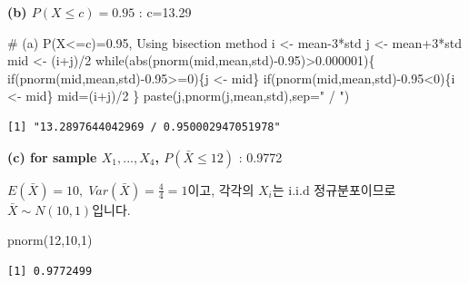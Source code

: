 \documentclass[
  a4paper,
  DIV=11,
  numbers=noendperiod]{scrreprt}
\newenvironment{Shaded}{\begin{snugshade}}{\end{snugshade}}
\newcommand{\AttributeTok}[1]{\textcolor[rgb]{0.40,0.45,0.13}{#1}}
\newcommand{\CommentTok}[1]{\textcolor[rgb]{0.37,0.37,0.37}{#1}}
\newcommand{\ControlFlowTok}[1]{\textcolor[rgb]{0.00,0.23,0.31}{#1}}
\newcommand{\DecValTok}[1]{\textcolor[rgb]{0.68,0.00,0.00}{#1}}
\newcommand{\FloatTok}[1]{\textcolor[rgb]{0.68,0.00,0.00}{#1}}
\newcommand{\FunctionTok}[1]{\textcolor[rgb]{0.28,0.35,0.67}{#1}}
\newcommand{\NormalTok}[1]{\textcolor[rgb]{0.00,0.23,0.31}{#1}}
\newcommand{\OtherTok}[1]{\textcolor[rgb]{0.00,0.23,0.31}{#1}}
\newcommand{\SpecialCharTok}[1]{\textcolor[rgb]{0.37,0.37,0.37}{#1}}
\newcommand{\StringTok}[1]{\textcolor[rgb]{0.13,0.47,0.30}{#1}}
\begin{document}
\textbf{(b) \(P(X\leq c)=0.95\)} : c=13.29

\begin{Shaded}
\begin{Highlighting}[]
\CommentTok{\# (a) P(X\textless{}=c)=0.95, Using bisection method}
\NormalTok{i }\OtherTok{\textless{}{-}}\NormalTok{ mean}\DecValTok{{-}3}\SpecialCharTok{*}\NormalTok{std}
\NormalTok{j }\OtherTok{\textless{}{-}}\NormalTok{ mean}\SpecialCharTok{+}\DecValTok{3}\SpecialCharTok{*}\NormalTok{std}
\NormalTok{mid }\OtherTok{\textless{}{-}}\NormalTok{ (i}\SpecialCharTok{+}\NormalTok{j)}\SpecialCharTok{/}\DecValTok{2}
\ControlFlowTok{while}\NormalTok{(}\FunctionTok{abs}\NormalTok{(}\FunctionTok{pnorm}\NormalTok{(mid,mean,std)}\SpecialCharTok{{-}}\FloatTok{0.95}\NormalTok{)}\SpecialCharTok{\textgreater{}}\FloatTok{0.000001}\NormalTok{)\{}
  \ControlFlowTok{if}\NormalTok{(}\FunctionTok{pnorm}\NormalTok{(mid,mean,std)}\SpecialCharTok{{-}}\FloatTok{0.95}\SpecialCharTok{\textgreater{}=}\DecValTok{0}\NormalTok{)\{j }\OtherTok{\textless{}{-}}\NormalTok{ mid\}}
  \ControlFlowTok{if}\NormalTok{(}\FunctionTok{pnorm}\NormalTok{(mid,mean,std)}\SpecialCharTok{{-}}\FloatTok{0.95}\SpecialCharTok{\textless{}}\DecValTok{0}\NormalTok{)\{i }\OtherTok{\textless{}{-}}\NormalTok{ mid\}}
\NormalTok{  mid}\OtherTok{=}\NormalTok{(i}\SpecialCharTok{+}\NormalTok{j)}\SpecialCharTok{/}\DecValTok{2}
\NormalTok{\}}
\FunctionTok{paste}\NormalTok{(j,}\FunctionTok{pnorm}\NormalTok{(j,mean,std),}\AttributeTok{sep=}\StringTok{" / "}\NormalTok{)}
\end{Highlighting}
\end{Shaded}

\begin{verbatim}
[1] "13.2897644042969 / 0.950002947051978"
\end{verbatim}

\textbf{(c) for sample \({X_1,...,X_4}\), \(P(\bar{X}\leq 12)\)} :
0.9772

\(E(\bar{X})=10,\;Var(\bar{X})=\frac{4}{4}=1\)이고, 각각의 \(X_i\)는
i.i.d 정규분포이므로 \(\bar{X}\sim N(10,1)\)입니다.

\begin{Shaded}
\begin{Highlighting}[]
\FunctionTok{pnorm}\NormalTok{(}\DecValTok{12}\NormalTok{,}\DecValTok{10}\NormalTok{,}\DecValTok{1}\NormalTok{)}
\end{Highlighting}
\end{Shaded}

\begin{verbatim}
[1] 0.9772499
\end{verbatim}
\end{document}
